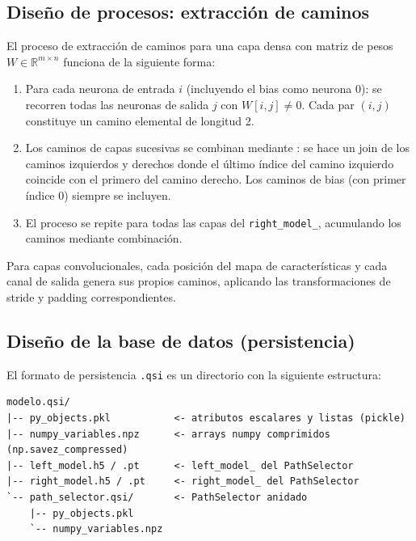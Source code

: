 \subsection{Diseño de procesos: extracción de caminos}

El proceso de extracción de caminos para una capa densa con matriz de pesos
$W \in \mathbb{R}^{m \times n}$ funciona de la siguiente forma:

\begin{enumerate}
  \item Para cada neurona de entrada $i$ (incluyendo el bias como neurona $0$): se recorren todas
        las neuronas de salida $j$ con $W[i, j] \neq 0$. Cada par $(i, j)$ constituye un camino
        elemental de longitud 2.
  \item Los caminos de capas sucesivas se combinan mediante : se
        hace un join de los caminos izquierdos y derechos donde el último índice del camino
        izquierdo coincide con el primero del camino derecho. Los caminos de bias (con primer índice
        0) siempre se incluyen.
  \item El proceso se repite para todas las capas del \texttt{right\_model\_}, acumulando los
        caminos mediante combinación.
\end{enumerate}

Para capas convolucionales, cada posición del mapa de características y cada canal de salida genera
sus propios caminos, aplicando las transformaciones de stride y padding correspondientes.

\subsection{Diseño de la base de datos (persistencia)}

El formato de persistencia \texttt{.qsi} es un directorio con la siguiente estructura:

\begin{lstlisting}[caption={Estructura del directorio de persistencia \texttt{.qsi}.}]
modelo.qsi/
|-- py_objects.pkl           <- atributos escalares y listas (pickle)
|-- numpy_variables.npz      <- arrays numpy comprimidos (np.savez_compressed)
|-- left_model.h5 / .pt      <- left_model_ del PathSelector
|-- right_model.h5 / .pt     <- right_model_ del PathSelector
`-- path_selector.qsi/       <- PathSelector anidado
    |-- py_objects.pkl
    `-- numpy_variables.npz
\end{lstlisting}

